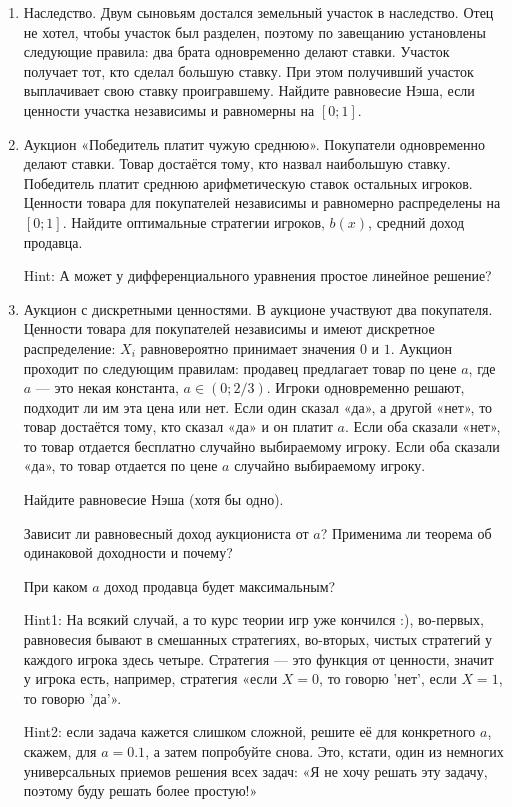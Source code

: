 \begin{enumerate}
\item Наследство. Двум сыновьям достался земельный участок в наследство. Отец не хотел, чтобы участок был разделен, поэтому по завещанию установлены следующие правила: два брата одновременно делают ставки. Участок получает тот, кто сделал большую ставку. При этом получивший участок выплачивает свою ставку проигравшему. Найдите равновесие Нэша, если ценности участка независимы и равномерны на $ [0;1] $.

\item Аукцион «Победитель платит чужую среднюю». Покупатели одновременно делают ставки. Товар достаётся тому, кто назвал наибольшую ставку. Победитель платит среднюю арифметическую ставок остальных игроков. Ценности товара для покупателей независимы и равномерно распределены на $ [0;1] $. Найдите оптимальные стратегии игроков, $ b(x) $, средний доход продавца.

Hint: А может у дифференциального уравнения простое линейное решение?


\item Аукцион с дискретными ценностями. В аукционе участвуют два покупателя. Ценности товара для покупателей независимы и имеют дискретное распределение: $ X_{i} $ равновероятно принимает значения $ 0 $ и $ 1 $. Аукцион проходит по следующим правилам: продавец предлагает товар по цене $ a $, где $ a $ — это некая константа, $ a\in (0;2/3) $. Игроки одновременно решают, подходит ли им эта цена или нет. Если один сказал «да», а другой «нет», то товар достаётся тому, кто сказал «да» и он платит $ a $. Если оба сказали «нет», то товар отдается бесплатно случайно выбираемому игроку. Если оба сказали «да», то товар отдается по цене $ a $ случайно выбираемому игроку.

Найдите равновесие Нэша (хотя бы одно).

Зависит ли равновесный доход аукциониста от $ a $? Применима ли теорема об одинаковой доходности и почему?

При каком $ a $ доход продавца будет максимальным?

Hint1: На всякий случай, а то курс теории игр уже кончился :), во-первых, равновесия бывают в смешанных стратегиях, во-вторых, чистых стратегий у каждого игрока здесь четыре. Стратегия — это функция от ценности, значит у игрока есть, например, стратегия «если $ X=0 $, то говорю 'нет', если $ X=1 $, то говорю 'да'».

Hint2: если задача кажется слишком сложной, решите её для конкретного $ a $, скажем, для $ a=0.1 $, а затем попробуйте снова. Это, кстати, один из немногих универсальных приемов решения всех задач: «Я не хочу решать эту задачу, поэтому буду решать более простую!»


\end{enumerate}


